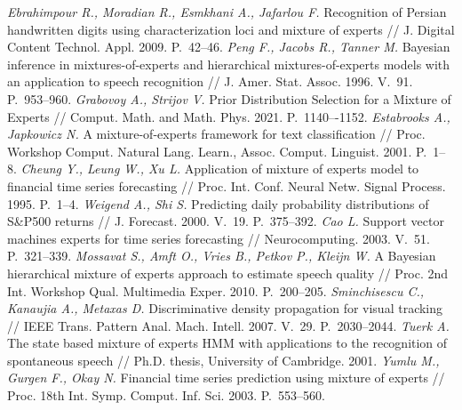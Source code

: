 \documentclass[12pt]{a&t}
\begin{document}
\begin{thebibliography}{}
	\textit{Ebrahimpour R., Moradian R., Esmkhani A., Jafarlou F.} Recognition of Persian handwritten digits using characterization loci and mixture of experts // J. Digital Content Technol. Appl. 2009. P.~42--46.
	\textit{Peng F., Jacobs R., Tanner M.} Bayesian inference in mixtures-of-experts and hierarchical mixtures-of-experts models with an application to speech recognition // J. Amer. Stat. Assoc. 1996. V.~91. P.~953--960.
	\textit{Grabovoy A., Strijov V.} Prior Distribution Selection for a Mixture of Experts // Comput. Math. and Math. Phys. 2021. P.~1140–-1152.
	\textit{Estabrooks A., Japkowicz N.} A mixture-of-experts framework for text classification // Proc. Workshop Comput. Natural Lang. Learn., Assoc. Comput. Linguist. 2001. P.~1--8.
	\textit{Cheung Y., Leung W., Xu L.} Application of mixture of experts model to financial time series forecasting // Proc. Int. Conf. Neural Netw. Signal Process. 1995. P.~1--4.
	\textit{Weigend A., Shi S.} Predicting daily probability distributions of S\&P500 returns // J. Forecast. 2000. V.~19. P.~375--392.
	\textit{Cao L.} Support vector machines experts for time series forecasting // Neurocomputing. 2003. V.~51. P.~321--339.
	\textit{Mossavat S., Amft O., Vries B., Petkov P., Kleijn W.} A Bayesian hierarchical mixture of experts approach to estimate speech quality // Proc. 2nd Int. Workshop Qual. Multimedia Exper. 2010. P.~200--205.
	\textit{Sminchisescu C., Kanaujia A., Metaxas D.} Discriminative density propagation for visual tracking // IEEE Trans. Pattern Anal. Mach. Intell. 2007. V.~29. P.~2030--2044.
	\textit{Tuerk A.} The state based mixture of experts HMM with applications to the recognition of spontaneous speech // Ph.D. thesis, University of Cambridge. 2001.
	\textit{Yumlu M., Gurgen F.,  Okay N.} Financial time series prediction using mixture of experts // Proc. 18th Int. Symp. Comput. Inf. Sci. 2003. P.~553--560.
\end{thebibliography}
\end{document}
